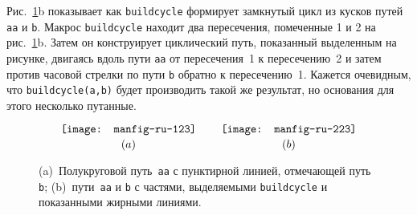 \documentclass{article} %
\begin{document}
Рис.~\ref{fig22}b показывает как {\tt buildcycle} формирует замкнутый цикл 
из кусков путей {\tt aa} и {\tt b}. 
Макрос {\tt buildcycle} находит два пересечения,
помеченные 1 и 2 на рис.~\ref{fig22}b. 
Затем он конструирует циклический путь, показанный выделенным на 
рисунке, двигаясь вдоль пути {\tt aa} от пересечения~1 к пересечению~2 
и затем против часовой стрелки по пути {\tt b} обратно к пересечению~1.
Кажется очевидным, что {\tt buildcycle(a,b)} будет производить такой же 
результат, но основания для этого несколько путанные.

\begin{figure}[htp]
$$ {\texttt{[image: manfig-ru-123]} \atop (a)}
 \qquad {\texttt{[image: manfig-ru-223]} \atop (b)}
$$
\caption[Демонстрация построения цикла]
        {(a)~Полукруговой путь~{\tt aa}
        с пунктирной линией, отмечающей путь {\tt b}; (b)~пути~{\tt aa} и {\tt b}
        с частями, выделяемыми {\tt buildcycle} и показанными жирными линиями.}
\label{fig22}
\end{figure}
\end{document}
